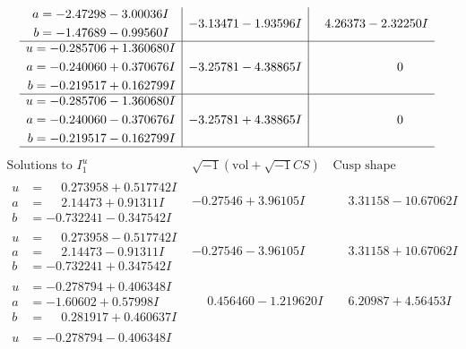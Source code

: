 \documentclass[1p]{elsarticle_modified}
\theoremstyle{definition}
\newcommand{\I}{\sqrt{-1}}
\begin{document}
$$\begin{array}{c|c|c}
\begin{aligned}
a &= -2.47298 - 3.00036 I \\
b &= -1.47689 - 0.99560 I\end{aligned}
 & -3.13471 - 1.93596 I & \phantom{-}4.26373 - 2.32250 I \\ \hline\begin{aligned}
u &= -0.285706 + 1.360680 I \\
a &= -0.240060 + 0.370676 I \\
b &= -0.219517 + 0.162799 I\end{aligned}
 & -3.25781 - 4.38865 I & \phantom{-0.000000 } 0 \\ \hline\begin{aligned}
u &= -0.285706 - 1.360680 I \\
a &= -0.240060 - 0.370676 I \\
b &= -0.219517 - 0.162799 I\end{aligned}
 & -3.25781 + 4.38865 I & \phantom{-0.000000 } 0\\
 \hline 
 \end{array}$$\newpage$$\begin{array}{c|c|c}  
\text{Solutions to }I^u_{1}& \I (\text{vol} + \sqrt{-1}CS) & \text{Cusp shape}\\
 \hline 
\begin{aligned}
u &= \phantom{-}0.273958 + 0.517742 I \\
a &= \phantom{-}2.14473 + 0.91311 I \\
b &= -0.732241 - 0.347542 I\end{aligned}
 & -0.27546 + 3.96105 I & \phantom{-}3.31158 - 10.67062 I \\ \hline\begin{aligned}
u &= \phantom{-}0.273958 - 0.517742 I \\
a &= \phantom{-}2.14473 - 0.91311 I \\
b &= -0.732241 + 0.347542 I\end{aligned}
 & -0.27546 - 3.96105 I & \phantom{-}3.31158 + 10.67062 I \\ \hline\begin{aligned}
u &= -0.278794 + 0.406348 I \\
a &= -1.60602 + 0.57998 I \\
b &= \phantom{-}0.281917 + 0.460637 I\end{aligned}
 & \phantom{-}0.456460 - 1.219620 I & \phantom{-}6.20987 + 4.56453 I \\ \hline\begin{aligned}
u &= -0.278794 - 0.406348 I \\

\end{aligned}
\end{array}$$
\end{document}
